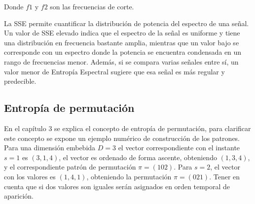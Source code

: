 Donde $f1$ y $f2$ son las frecuencias de corte.

La SSE permite cuantificar la distribución de potencia del espectro de una señal. Un valor de
SSE elevado indica que el espectro de la señal es uniforme y tiene una distribución en
frecuencia bastante amplia, mientras que un valor bajo se corresponde con un espectro
donde la potencia se encuentra condensada en un rango de frecuencias menor. Además, si
se compara varias señales entre sí, un valor menor de Entropía Espectral sugiere que esa
señal es más regular y predecible.

\subsection{Entropía de permutación}

En el capítulo 3 se explica el concepto de entropía de permutación, para clarificar este concepto se expone un ejemplo numérico de construcción de los patrones. Para una dimensión embebida $D=3$ el vector correspondiente con el instante $s=1$ es $(3,1,4)$, el vector es ordenado de forma ascente, obteniendo $(1,3,4)$, y el correspondiente patrón de permutación $\pi=(102)$. Para $s=2$, el vector con los valores es $(1,4,1)$, obteniendo la permutación $\pi=(021)$. Tener en cuenta que si dos valores son iguales serán asignados en orden temporal de aparición.

